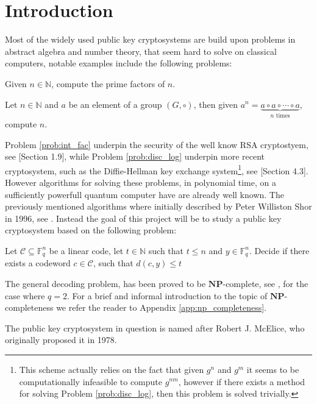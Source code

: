  \chapter{Introduction}
 Most of the widely used public key cryptosystems are build upon problems in abstract algebra and number theory, that seem hard to solve on classical computers, notable examples include the following problems:
 \begin{problem}\label{prob:int_fac}
   Given $n \in \mathbb{N}$, compute the prime factors of $n$.
 \end{problem}
 \begin{problem}\label{prob:disc_log}
   Let $n \in \mathbb{N}$ and $a$ be an element of a group $(G, \circ)$, then given $a^{n} = \underset{n \text{ times} }{\underbrace{a \circ a \circ \cdots \circ a}}$, compute $n$.
 \end{problem}
 Problem \ref{prob:int_fac} underpin the security of the well know RSA cryptostyem, see \cite{alg_lauritzen}[Section 1.9], while Problem \ref{prob:disc_log} underpin more recent cryptosystem, such as the Diffie-Hellman key exchange system\footnote{This scheme actually relies on the fact that given $g^{n}$ and $g^{m}$ it seems to be computationally infeasible to compute $g^{nm}$, however if there exists a method for solving Problem \ref{prob:disc_log}, then this problem is solved trivially.}, see \cite{n_t_and_c}[Section 4.3]. However algorithms for solving these problems, in polynomial time, on a sufficiently powerfull quantum computer have are already well known. The previously mentioned algorithms where initially described by Peter Williston Shor in 1996, see \cite{shor}. Instead the goal of this project will be to study a public key cryptosystem based on the following problem:

 \begin{problem}\label{prob:general_decoding}
   Let $\mathcal{C} \subseteq \mathbb{F}_q^{n}$ be a linear code, let $t \in \mathbb{N}$ such that $t \leq n$ and $y \in \mathbb{F}_q^n$. Decide if there exists a codeword $c \in \mathcal{C}$, such that $d(c, y) \leq t$
 \end{problem}
 The general decoding problem, has been proved to be $\mathbf{NP}$-complete, see \cite{general_decoding_problem_is_np}, for the case where $q = 2$. For a brief and informal introduction to the topic of $\mathbf{NP}$-completeness we refer the reader to Appendix \ref{app:np_completeness}.

 The public key cryptosystem in question is named after Robert J. McElice, who originally proposed it in 1978.

 
 

